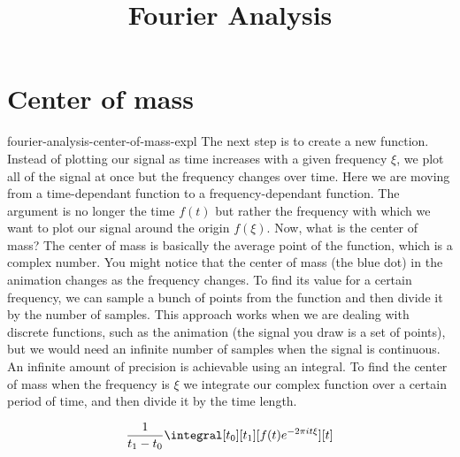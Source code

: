 \documentclass[preview]{standalone}
\begin{document}
\title{Fourier Analysis}
\genpage

\section{Center of mass}

\begin{snippet}{fourier-analysis-center-of-mass-expl}
    The next step is to create a new function. Instead of plotting our signal
    as time increases with a given frequency \(\xi\), we plot all of the
    signal at once but the frequency changes over time. Here we are moving from
    a time-dependant function to a frequency-dependant function. The argument is
    no longer the time \(f(t)\) but rather the frequency with which we want to plot our signal
    around the origin \(f(\xi)\). Now, what is the center of mass? The center of mass is
    basically the average point of the function, which is a complex number.
    You might notice that the center of mass (the blue dot) in the animation changes
    as the frequency changes. To find its value for a certain frequency, we can sample
    a bunch of points from the function and then divide it by the number of samples.
    This approach works when we are dealing with discrete functions, such as the animation
    (the signal you draw is a set of points), but we would need an infinite number of samples
    when the signal is continuous. An infinite amount of precision is achievable using an integral.
    To find the center of mass when the frequency is \(\xi\) we integrate our complex function over
    a certain period of time, and then divide it by the time length.

    \[
        \frac{1}{t_1-t_0}
        \integral[t_0][t_1][f(t)e^{-2\pi i t\xi}][t]
    \]
\end{snippet}

\end{document}
